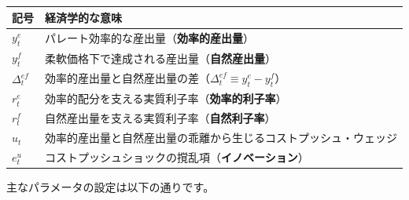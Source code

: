 \documentclass[
  japanese,
  lualatex,
  ja=standard,
  12pt,
  a4paper]{ltjsarticle}
\newcounter{none} %
\begin{document}
{\def\LTcaptype{none} %
\begin{longtable}[]{@{}
  >{\raggedright\arraybackslash}p{}
  >{\raggedright\arraybackslash}p{}@{}}
\toprule\noalign{}
\begin{minipage}[b]{\linewidth}\raggedright
記号
\end{minipage} & \begin{minipage}[b]{\linewidth}\raggedright
経済学的な意味
\end{minipage} \\
\midrule\noalign{}
\endhead
\bottomrule\noalign{}
\endlastfoot
\(y_t^e\) & パレート効率的な産出量（\textbf{効率的産出量}） \\
\(y_t^f\) & 柔軟価格下で達成される産出量（\textbf{自然産出量}） \\
\(\Delta_t^{ef}\) &
効率的産出量と自然産出量の差（\textbf{\(\Delta_t^{ef} \equiv y_t^e - y_t^f\)}） \\
\(r_t^e\) & 効率的配分を支える実質利子率（\textbf{効率的利子率}） \\
\(r_t^f\) & 自然産出量を支える実質利子率（\textbf{自然利子率}） \\
\(u_t\) &
効率的産出量と自然産出量の乖離から生じるコストプッシュ・ウェッジ \\
\(e_t^u\) & コストプッシュショックの撹乱項（\textbf{イノベーション}） \\
\end{longtable}
}

主なパラメータの設定は以下の通りです。
\end{document}
